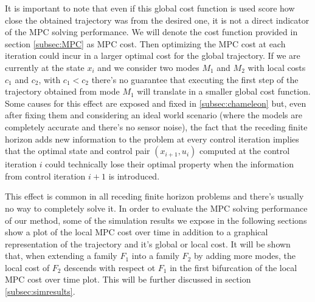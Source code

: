 \documentclass[12,twoside]{TFG-GM}
\theoremstyle{definition}
\theoremstyle{remark}
\begin{document}
It is important to note that even if this global cost function is used score how close the obtained trajectory was from the desired one, it is not a direct indicator of the MPC solving performance. We will denote the cost function provided in section \ref{subsec:MPC} as MPC cost. Then optimizing the MPC cost at each iteration could incur in a larger optimal cost for the global trajectory. If we are currently at the state $x_i$ and we consider two modes $M_1$ and $M_2$ with local costs $c_1$ and $c_2$, with $c_1 < c_2$ there's no guarantee that executing the first step of the trajectory obtained from mode $M_1$ will translate in a smaller global cost function. Some causes for this effect are exposed and fixed in \ref{subsec:chameleon} but, even after fixing them and considering an ideal world scenario (where the models are completely accurate and there's no sensor noise), the fact that the receding finite horizon adds new information to the problem at every control iteration implies that the optimal state and control pair $(x_{i+1}, u_{i})$ computed at the control iteration $i$ could technically lose their optimal property when the information from control iteration $i+1$ is introduced.

This effect is common in all receding finite horizon problems and there's usually no way to completely solve it. In order to evaluate the MPC solving performance of our method, some of the simulation results we expose in the following sections show a plot of the local MPC cost over time in addition to a graphical representation of the trajectory and it's global or local cost. It will be shown that, when extending a family $F_1$ into a family $F_2$ by adding more modes, the local cost of $F_2$ descends with respect ot $F_1$ in the first bifurcation of the local MPC cost over time plot. This will be further discussed in section \ref{subsec:simresults}.
\end{document}
